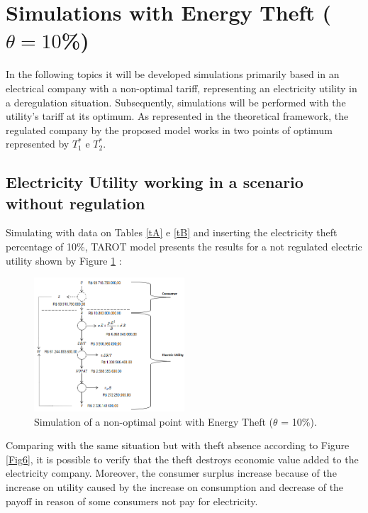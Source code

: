 \documentclass[preprint,12pt]{elsarticle}
\begin{document}
\section{Simulations with Energy Theft ($\theta = 10$\%)}
\label{S.4}

In the following topics it will be developed simulations primarily based in an electrical company with a non-optimal tariff, representing an electricity utility in a deregulation situation. Subsequently, simulations will be performed with the utility's tariff at its optimum. As represented in the theoretical framework, the regulated company by the proposed model works in two points of optimum represented by $T_1^*$ e $T_2^*$.\\ 

\subsection{Electricity Utility working in a scenario without regulation}
\label{sec4-1}
Simulating with data on Tables \ref{tA} e \ref{tB} and inserting the electricity theft percentage of 10\%,   TAROT model presents the results for a not regulated electric utility shown by Figure \ref{Fig9} :\\

\begin{figure}[h]%
\centering
\includegraphics[width = 0.5\textwidth]{Fig9.png} 
\caption{Simulation of a non-optimal point with Energy Theft ($\theta$ = 10\%).}
\label{Fig9}
\end{figure}

Comparing with the same situation but with theft absence according to Figure \ref{Fig6}, it is possible to verify that the theft destroys economic value added to the electricity company. Moreover, the consumer surplus increase because of the increase on utility caused by the increase on consumption and decrease of the payoff in reason of some consumers not pay for electricity.
\end{document}
